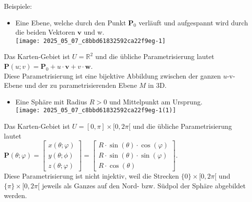 \documentclass[10pt]{article}
\begin{document}
Beispiele:

\begin{itemize}
  \item Eine Ebene, welche durch den Punkt $\mathbf{P}_{0}$ verläuft und aufgespannt wird durch die beiden Vektoren $\mathbf{v}$ und w.\\
\texttt{[image: 2025\_05\_07\_c8bbd61832592ca22f9eg-1]}
\end{itemize}

Das Karten-Gebiet ist $U=\mathbb{R}^{2}$ und die übliche Parametrisierung lautet\\
$\mathbf{P}(u ; v)=\mathbf{P}_{0}+u \cdot \mathbf{v}+v \cdot \mathbf{w}$.\\
Diese Parametrisierung ist eine bijektive Abbildung zwischen der ganzen $u$-v-Ebene und der zu parametrisierenden Ebene $M$ in 3D.

\begin{itemize}
  \item Eine Sphäre mit Radius $R>0$ und Mittelpunkt am Ursprung.\\
\texttt{[image: 2025\_05\_07\_c8bbd61832592ca22f9eg-1(1)]}
\end{itemize}

Das Karten-Gebiet ist $U=[0, \pi] \times[0,2 \pi[$ und die übliche Parametrisierung lautet\\
$\mathbf{P}(\theta ; \varphi)=\left[\begin{array}{c}x(\theta ; \varphi) \\ y(\theta ; \phi) \\ z(\theta ; \varphi)\end{array}\right]=\left[\begin{array}{r}R \cdot \sin (\theta) \cdot \cos (\varphi) \\ R \cdot \sin (\theta) \cdot \sin (\varphi) \\ R \cdot \cos (\theta)\end{array}\right]$.\\
Diese Parametrisierung ist nicht injektiv, weil die Strecken $\{0\} \times[0,2 \pi[$ und $\{\pi\} \times[0,2 \pi[$ jeweils als Ganzes auf den Nord- bzw. Südpol der Sphäre abgebildet werden.
\end{document}
